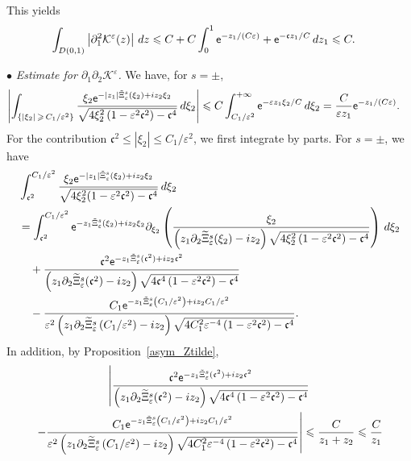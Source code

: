 \documentclass[10pt]{amsart}
\theoremstyle{definition}\newtheorem{defi}[theo]{Definition}\newtheorem{rema}[theo]{Remark}\newtheorem{exam}[theo]{Example}\newtheorem{exem}[theo]{Example}\newtheorem{nota}[theo]{Notation}
\newcommand*\p{\partial}
\newcommand*\BK{\mathcal{K}}
\newcommand*\ex{{\sf e}}
\newcommand*\cs{{\mathfrak c}}
\newcommand*\ii{\infty}
\newcommand*\gs{\geqslant }
\newcommand*\ls{\leqslant }
\newcommand*\e{\varepsilon}
\renewcommand*\t{\tilde}
\let\oldtilde\tilde
\renewcommand*{\tilde}[1]{\mathchoice{\widetilde{#1}}{\widetilde{#1}}{\oldtilde{#1}}{\oldtilde{#1}}}
\begin{document}
This yields
\begin{align*}
\int_{D(0,1)} \left\lvert \p_1^2 \BK^\e (z) \right\rvert \, dz & \ls C + C \int_0^1 \ex^{- z_1/(C \e) } + \ex^{ - \cs z_1/C } \, d z_1
\ls C.
\end{align*}


\noindent $ \bullet $ \emph{Estimate for $ \p_1 \p_2 \BK^\e $.} We have, for $ s = \pm $,
\begin{align*}
\left\lvert \int_{\left\{ |\xi_2 |\,\gs\,C_1 / \e^{2}\right\} } \frac{ \xi_2 \ex^{- |z_1| \t\Xi_\e^s (\xi_2) + i z_2 \xi_2} }{
\sqrt{ 4 \xi_2^2 \left(1 - \e^2 \cs^2\right) - \cs^4 } } \, d\xi_2 \right\rvert & \ls C \int_{C_1 / \e^{2}}^{+\ii } \ex^{- \e z_1 \xi_2 /C } \, d\xi_2 = \frac{C}{\e z_1} \ex^{ - z_1/(C \e) }.
\end{align*}
For the contribution $ \cs^2 \ls |\xi_2 | \ls C_1 / \e^{2} $, we first integrate by parts. For $ s= \pm $, we have
\begin{equation}\label{K12_zero_IPP}
\begin{split}
& \int_{ \cs^2 }^{ C_1 /\e^{2} } \frac{ \xi_2 \ex^{- |z_1| \t\Xi_\e^s (\xi_2) + i z_2 \xi_2} }{
\sqrt{ 4 \xi_2^2 (1 - \e^2 \cs^2) - \cs^4 } } \, d\xi_2
\\ & = \int_{ \cs^2 }^{ C_1 / \e^{2} } \ex^{- z_1 \t\Xi_\e^s (\xi_2) + i z_2 \xi_2}
\p_{\xi_2} \left(\frac{ \xi_2 }{\left(z_1 \p_2 \t\Xi_\e^s (\xi_2) - i z_2\right) \sqrt{ 4 \xi_2^2 \left(1 - \e^2 \cs^2\right) - \cs^4 } } \right) \, d\xi_2
\\& \quad + \frac{ \cs^2 \ex^{- z_1 \t\Xi_\e^s (\cs^2) + i z_2 \cs^2} }{\left(z_1 \p_2 \t\Xi_\e^s (\cs^2) - i z_2\right) \sqrt{ 4 \cs^4 \left(1 - \e^2 \cs^2\right) - \cs^4 } }
\\& \quad - \frac{ C_1 \ex^{- z_1 \t\Xi_\e^s \left(C_1 / \e^{2}\right) + i z_2 C_1 / \e^{2} } }{ \e^{2} \left(z_1 \p_2 \t\Xi_\e^s \left(C_1 / \e^{2}\right) - i z_2\right) \sqrt{ 4 C_1^2 \e^{-4} \left(1 - \e^2 \cs^2\right) - \cs^4 } }.
\end{split}
\end{equation}
In addition, by Proposition~\ref{asym_Ztilde},
\begin{multline*}
\left\lvert  \frac{ \cs^2 \ex^{- z_1 \t\Xi_\e^s (\cs^2) + i z_2 \cs^2} }{\left(z_1 \p_2 \t\Xi_\e^s (\cs^2) - i z_2\right) \sqrt{ 4 \cs^4 \left(1 - \e^2 \cs^2\right) - \cs^4 } }\right.
\\ \left. - \frac{ C_1 \ex^{- z_1 \t\Xi_\e^s \left(C_1 / \e^{2}\right) + i z_2 C_1 / \e^{2} } }{ \e^{2} \left(z_1 \p_2 \t\Xi_\e^s \left(C_1/ \e^{2}\right) - i z_2\right) \sqrt{ 4 C_1^2 \e^{-4} \left(1 - \e^2 \cs^2\right) - \cs^4 } }
\right\rvert
\ls \frac{C}{z_1+ z_2}
\ls \frac{C}{z_1}
\end{multline*}
\end{document}
